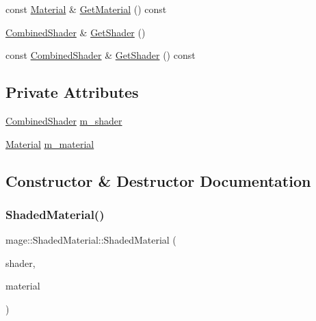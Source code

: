 \begin{DoxyCompactItemize}
\item 
const \hyperlink{structmage_1_1_material}{Material} \& \hyperlink{structmage_1_1_shaded_material_a936a1cb2c79b28818814ac504d059ea3}{Get\+Material} () const
\item 
\hyperlink{structmage_1_1_combined_shader}{Combined\+Shader} \& \hyperlink{structmage_1_1_shaded_material_a1138a96b289a841920f39553ebb230d1}{Get\+Shader} ()
\item 
const \hyperlink{structmage_1_1_combined_shader}{Combined\+Shader} \& \hyperlink{structmage_1_1_shaded_material_ac03da6f1dfd81fc19da5a8f8214662ee}{Get\+Shader} () const
\end{DoxyCompactItemize}
\subsection*{Private Attributes}
\begin{DoxyCompactItemize}
\item 
\hyperlink{structmage_1_1_combined_shader}{Combined\+Shader} \hyperlink{structmage_1_1_shaded_material_a712d07ac1995ff592bbb8ab20a294270}{m\+\_\+shader}
\item 
\hyperlink{structmage_1_1_material}{Material} \hyperlink{structmage_1_1_shaded_material_a319e1ca2103c50f84ce0605b08bd34b4}{m\+\_\+material}
\end{DoxyCompactItemize}


\subsection{Constructor \& Destructor Documentation}
\hypertarget{structmage_1_1_shaded_material_a58594c0008865c68efc6ff6868016236}{}\label{structmage_1_1_shaded_material_a58594c0008865c68efc6ff6868016236} 
\subsubsection{\texorpdfstring{Shaded\+Material()}{ShadedMaterial()}\hspace{0.1cm}{\footnotesize\ttfamily [1/3]}}
{\footnotesize\ttfamily mage\+::\+Shaded\+Material\+::\+Shaded\+Material (\begin{DoxyParamCaption}\item[{const \hyperlink{structmage_1_1_combined_shader}{Combined\+Shader} \&}]{shader,  }\item[{const \hyperlink{structmage_1_1_material}{Material} \&}]{material }\end{DoxyParamCaption})\hspace{0.3cm}{\ttfamily [explicit]}}

